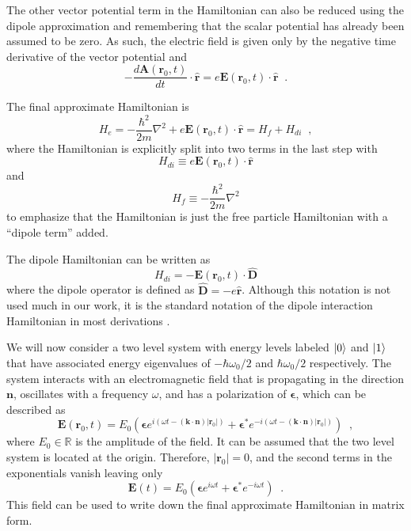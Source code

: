 The other vector potential term in the Hamiltonian can also be reduced using the dipole approximation and remembering that the scalar potential has already been assumed to be zero.  As such, the electric field is given only by the negative time derivative of the vector potential and
$$
-\frac{d\mathbf{A}(\mathbf{r}_0,t)}{dt}\cdot\hat{\mathbf{r}} = e\mathbf{E}\left(\mathbf{r}_0,t\right)\cdot\hat{\mathbf{r}}\;\;.
$$

The final approximate Hamiltonian is
$$
H_e = -\frac{\hbar^2}{2m}\nabla^2+e\mathbf{E}(\mathbf{r}_0,t)\cdot\hat{\mathbf{r}} = H_f + H_{di}\;\;,
$$
where the Hamiltonian is explicitly split into two terms in the last step with
$$
H_{di} \equiv e\mathbf{E}(\mathbf{r}_0,t)\cdot\hat{\mathbf{r}}
$$
and
$$
H_f \equiv -\frac{\hbar^2}{2m}\nabla^2
$$
to emphasize that the Hamiltonian is just the free particle Hamiltonian with a ``dipole term'' added.

The dipole Hamiltonian can be written as
$$
H_{di} = -\mathbf{E}(\mathbf{r}_0,t)\cdot\hat{\mathbf{D}}
$$
where the dipole operator is defined as $\hat{\mathbf{D}}=-e\hat{\mathbf{r}}$.  Although this notation is not used much in our work, it is the standard notation of the dipole interaction Hamiltonian in most derivations \cite{Loudon2000,Mandel1995,Cohen1997}.

We will now consider a two level system with energy levels labeled $\left|0\right\rangle$ and $\left|1\right\rangle$ that have associated energy eigenvalues of $-\hbar\omega_0/2$ and $\hbar\omega_0/2$ respectively.  The system interacts with an electromagnetic field that is propagating in the direction $\mathbf{n}$, oscillates with a frequency $\omega$, and has a polarization of $\mathbf{\epsilon}$, which can be described as
$$
\mathbf{E}(\mathbf{r}_0,t) = E_0\left( \mathbf{\epsilon} e^{i\left(\omega t-(\mathbf{k}\cdot\mathbf{n}) |\mathbf{r}_0|\right)} + \mathbf{\epsilon}^* e^{-i\left(\omega t-(\mathbf{k}\cdot\mathbf{n}) |\mathbf{r}_0|\right)}\right)\;\;,
$$
where $E_0\in\mathbb{R}$ is the amplitude of the field.  It can be assumed that the two level system is located at the origin.  Therefore, $|\mathbf{r}_0|=0$, and the second terms in the exponentials vanish leaving only
$$
\mathbf{E}(t) = E_0\left( \mathbf{\epsilon} e^{i\omega t} + \mathbf{\epsilon}^* e^{-i\omega t}\right)\;\;.
$$
This field can be used to write down the final approximate Hamiltonian in matrix form.  

